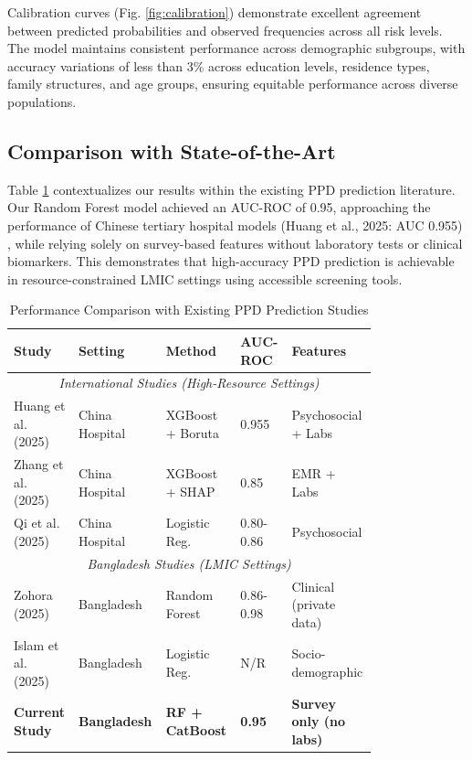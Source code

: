 Calibration curves (Fig. \ref{fig:calibration}) demonstrate excellent agreement between predicted probabilities and observed frequencies across all risk levels. The model maintains consistent performance across demographic subgroups, with accuracy variations of less than 3\% across education levels, residence types, family structures, and age groups, ensuring equitable performance across diverse populations.

\subsection{Comparison with State-of-the-Art}

Table \ref{tab:comparison_literature} contextualizes our results within the existing PPD prediction literature. Our Random Forest model achieved an AUC-ROC of 0.95, approaching the performance of Chinese tertiary hospital models (Huang et al., 2025: AUC 0.955) \cite{Huang2025}, while relying solely on survey-based features without laboratory tests or clinical biomarkers. This demonstrates that high-accuracy PPD prediction is achievable in resource-constrained LMIC settings using accessible screening tools.

\begin{table}[htbp]
\centering
\caption{Performance Comparison with Existing PPD Prediction Studies}
\label{tab:comparison_literature}
\begin{tabular}{p{0.12\linewidth}p{0.18\linewidth}p{0.15\linewidth}p{0.12\linewidth}p{0.22\linewidth}}
\toprule
\textbf{Study} & \textbf{Setting} & \textbf{Method} & \textbf{AUC-ROC} & \textbf{Features} \\
\midrule
\multicolumn{5}{c}{\textit{International Studies (High-Resource Settings)}} \\
\midrule
Huang et al. (2025) & China Hospital & XGBoost + Boruta & 0.955 & Psychosocial + Labs \\
Zhang et al. (2025) & China Hospital & XGBoost + SHAP & 0.85 & EMR + Labs \\
Qi et al. (2025) & China Hospital & Logistic Reg. & 0.80-0.86 & Psychosocial \\
\midrule
\multicolumn{5}{c}{\textit{Bangladesh Studies (LMIC Settings)}} \\
\midrule
Zohora (2025) & Bangladesh & Random Forest & 0.86-0.98 & Clinical (private data) \\
Islam et al. (2025) & Bangladesh & Logistic Reg. & N/R & Socio-demographic \\
\midrule
\textbf{Current Study} & \textbf{Bangladesh} & \textbf{RF + CatBoost} & \textbf{0.95} & \textbf{Survey only (no labs)} \\
\bottomrule
\end{tabular}
\end{table}

